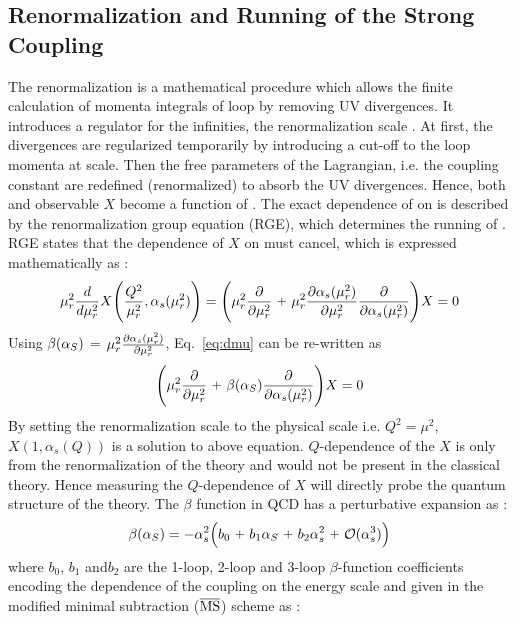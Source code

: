 \subsection{Renormalization and Running of the Strong Coupling}
The renormalization is a mathematical procedure which allows the finite calculation of momenta integrals of loop by removing UV divergences. It introduces a regulator for the infinities, the renormalization scale \mur. At first, the divergences are regularized temporarily by introducing a cut-off to the loop momenta at \mur scale. Then the free parameters of the Lagrangian, i.e. the coupling constant are redefined (renormalized) to absorb the UV divergences. Hence, both \alpsq and observable $X$ become a function of \mur. The exact dependence of \alpsmusq on \mur is described by the renormalization group equation (RGE), which determines the running of \alpsmusq. RGE states that the dependence of $X$ on \mur must cancel, which is expressed mathematically as : 
\begin{equation}
\mur^{2}\frac{d}{d\mur^{2}}X\Bigg(\frac{Q^{2}}{\mur^{2}},\alpha_{s}(\mur^{2})\Bigg)=
\Bigg(\mur^{2}\frac{\partial}{\partial\mur^{2}}~\plus \mur^{2}\frac{\partial\alpha_{s}(\mur^{2})}
{\partial\mur^{2}}\frac{\partial}{\partial\alpha_{s}(\mur^{2})}\Bigg)X=0
\label{eq:dmu}
\end{equation}
Using $\beta(\alpha_S)$ = $\mur^{2}\frac{\partial\alpha_{s}(\mur^{2})}{\partial\mur^{2}}$, Eq.~\ref{eq:dmu} can be re-written as 
\begin{equation}
\Bigg(\mur^{2}\frac{\partial}{\partial\mur^{2}}~\plus \beta(\alps)\frac{\partial}{\partial\alpha_{s}(\mur^{2})}\Bigg)X=0
\label{eq:dmu2}
\end{equation}
By setting the renormalization scale to the physical scale i.e. $Q^{2}=\mu^{2}$, $X(1,\alpha_{s}(Q))$ is a solution to above equation. $Q$-dependence of the $X$ is only from the renormalization of the theory and would not be present in the classical theory. Hence measuring the $Q$-dependence of $X$ will directly probe the quantum structure of the theory. The $\beta$ function in QCD has a perturbative expansion as : 
\begin{equation}
\beta(\alps)=-\alpha_{s}^{2}\Big(b_0~\plus b_1\alps~\plus b_2\alpha_{s}^{2}~\plus {\cal O}(\alpha_{s}^{3})\Big) 
\label{eq:beta}
\end{equation}
where $b_0$, $b_1$ and$b_2$ are the 1-loop, 2-loop and 3-loop $\beta$-function coefficients encoding the dependence of the coupling on the energy scale and given in the modified minimal subtraction ($\overline{\rm MS}$) scheme \cite{tHooft:1973mfk,Weinberg:1951ss} as :
